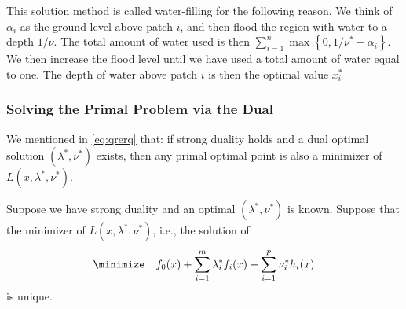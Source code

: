 \documentclass{article}
\begin{document}
\begin{exma}
This solution method is called water-filling for the following reason. We think of $\alpha_{i}$ as the ground level above patch $i$, and then flood the region with water to a depth $1 / \nu$. The total amount of water used is then $\sum_{i=1}^{n} \max \left\{0,1 / \nu^* -\alpha_{i}\right\} .$ We then increase the flood level until we have used a total amount of water equal to one. The depth of water above patch $i$ is then the optimal value $x_{i}^* $

\end{exma}

\subsubsection{Solving the Primal Problem via the Dual}
We mentioned in \cref{eq:qrerq} that: if strong duality holds and a dual optimal solution $\left(\lambda^* , \nu^* \right)$ exists, then any primal optimal point is also a minimizer of $L\left(x, \lambda^* , \nu^* \right)$. 

Suppose we have strong duality and an optimal $\left(\lambda^* , \nu^* \right)$ is known. Suppose that the minimizer of $L\left(x, \lambda^* , \nu^* \right)$, i.e., the solution of
\begin{align}
\minimize  \quad f_{0}(x)+\sum_{i=1}^{m} \lambda_{i}^*  f_{i}(x)+\sum_{i=1}^{p} \nu_{i}^*  h_{i}(x)
\end{align}\label{eq:nmzmne}
is unique. 
\end{document}
